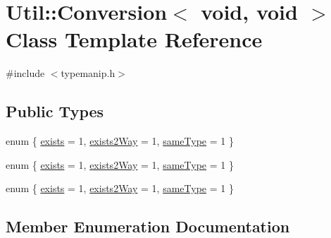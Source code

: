 \hypertarget{classUtil_1_1Conversion_3_01void_00_01void_01_4}{}\section{Util\+:\+:Conversion$<$ void, void $>$ Class Template Reference}
\label{classUtil_1_1Conversion_3_01void_00_01void_01_4}


{\ttfamily \#include $<$typemanip.\+h$>$}

\subsection*{Public Types}
\begin{DoxyCompactItemize}
\item 
enum \{ \mbox{\hyperlink{classUtil_1_1Conversion_3_01void_00_01void_01_4_acd6499947e2309a7b1a82e60519260eaa18f7b2927082c753d071488aa02e4f93}{exists}} = 1, 
\mbox{\hyperlink{classUtil_1_1Conversion_3_01void_00_01void_01_4_acd6499947e2309a7b1a82e60519260eaac0140b4c4cc5e507e75a25225c4e582b}{exists2\+Way}} = 1, 
\mbox{\hyperlink{classUtil_1_1Conversion_3_01void_00_01void_01_4_acd6499947e2309a7b1a82e60519260eaa46e61925c77304c10184471d7b52a8cd}{same\+Type}} = 1
 \}
\item 
enum \{ \mbox{\hyperlink{classUtil_1_1Conversion_3_01void_00_01void_01_4_acd6499947e2309a7b1a82e60519260eaa18f7b2927082c753d071488aa02e4f93}{exists}} = 1, 
\mbox{\hyperlink{classUtil_1_1Conversion_3_01void_00_01void_01_4_acd6499947e2309a7b1a82e60519260eaac0140b4c4cc5e507e75a25225c4e582b}{exists2\+Way}} = 1, 
\mbox{\hyperlink{classUtil_1_1Conversion_3_01void_00_01void_01_4_acd6499947e2309a7b1a82e60519260eaa46e61925c77304c10184471d7b52a8cd}{same\+Type}} = 1
 \}
\item 
enum \{ \mbox{\hyperlink{classUtil_1_1Conversion_3_01void_00_01void_01_4_acd6499947e2309a7b1a82e60519260eaa18f7b2927082c753d071488aa02e4f93}{exists}} = 1, 
\mbox{\hyperlink{classUtil_1_1Conversion_3_01void_00_01void_01_4_acd6499947e2309a7b1a82e60519260eaac0140b4c4cc5e507e75a25225c4e582b}{exists2\+Way}} = 1, 
\mbox{\hyperlink{classUtil_1_1Conversion_3_01void_00_01void_01_4_acd6499947e2309a7b1a82e60519260eaa46e61925c77304c10184471d7b52a8cd}{same\+Type}} = 1
 \}
\end{DoxyCompactItemize}


\subsection{Member Enumeration Documentation}
\mbox{\label{classUtil_1_1Conversion_3_01void_00_01void_01_4_af8cdbe252b89456d250a01848eb1752f}} 
